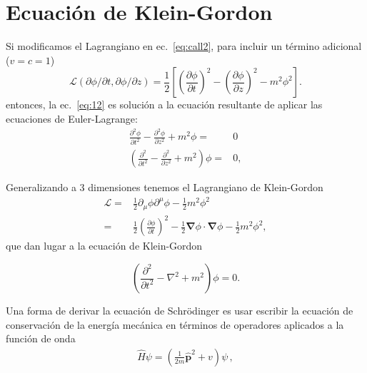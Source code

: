 \section{Ecuación de Klein-Gordon}


Si modificamos el Lagrangiano en ec.~\eqref{eq:call2}, para incluir un
t\'ermino adicional ($v=c=1$)
\begin{equation}
  \label{eq:14}
  \mathcal{L}(\partial\phi/\partial t,\partial\phi/\partial z)=\frac{1}{2}
\left[
  \left(\frac{\partial\phi}{\partial t}\right)^2-\left(\frac{\partial\phi}{\partial z}\right)^2-m^2\phi^2
\right].
\end{equation}
entonces, la ec.~\eqref{eq:12} es soluci\'on a la ecuaci\'on resultante de
aplicar las ecuaciones de Euler-Lagrange:
\begin{align}
\label{eq:150}
      \frac{\partial^2\phi}{\partial t^2}-\frac{\partial^2\phi}{\partial z^2}+m^2\phi=&0\nonumber\\
      \left(\frac{\partial^2}{\partial t^2}-\frac{\partial^2}{\partial z^2}+m^2
      \right)\phi=&0,
\end{align}

Generalizando a 3 dimensiones tenemos el Lagrangiano de Klein-Gordon
\begin{align}
  \label{eq:15}
  \mathcal{L}=&\frac12 \partial_{\mu}\phi\partial^{\mu}\phi-\frac12 m^2\phi^{2}\nonumber\\
=&\frac{1}{2}
  \left(
\frac{\partial\phi}{\partial t}
  \right)^2-\tfrac{1}{2}\boldsymbol{\nabla}\phi\cdot\boldsymbol{\nabla}\phi-\tfrac{1}{2}m^2\phi^2,
\end{align}
que dan lugar a la ecuaci\'on de Klein-Gordon

\begin{equation}
\label{eq:152}
  \left(
\frac{\partial^2}{\partial t^2}-\nabla^2+m^2
  \right)\phi=0.
\end{equation}

Una forma de derivar la ecuación de Schr\"odinger es usar escribir la ecuación de conservación de la energía mecánica en términos de operadores aplicados a la función de onda
\begin{align}
  \widehat{H}\psi=\left( \frac{1}{2m}\widehat{\mathbf{p}}^{2}+v \right)\psi\,,
\end{align}

